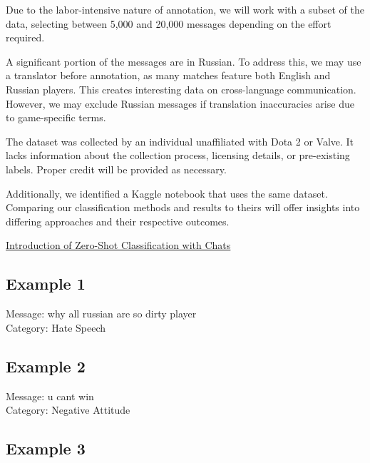 \documentclass[11pt, letterpaper, notitlepage]{article}
\begin{document}
Due to the labor-intensive nature of annotation, we will work with a subset of the data, selecting between 5,000 and 20,000 messages depending on the effort required.

A significant portion of the messages are in Russian. To address this, we may use a translator before annotation, as many matches feature both English and Russian players. This creates interesting data on cross-language communication. However, we may exclude Russian messages if translation inaccuracies arise due to game-specific terms.

The dataset was collected by an individual unaffiliated with Dota 2 or Valve. It lacks information about the collection process, licensing details, or pre-existing labels. Proper credit will be provided as necessary.

Additionally, we identified a Kaggle notebook that uses the same dataset. Comparing our classification methods and results to theirs will offer insights into differing approaches and their respective outcomes.


\begin{center}
    \href{https://www.kaggle.com/code/adelsondias/introduction-of-zero-shot-classification-w-chats}{Introduction of Zero-Shot Classification with Chats}
\end{center}



\subsection{Example 1}

Message: why all russian are so dirty player\\
Category: Hate Speech

\subsection{Example 2}

Message: u cant win\\
Category: Negative Attitude

\subsection{Example 3}
\end{document}

